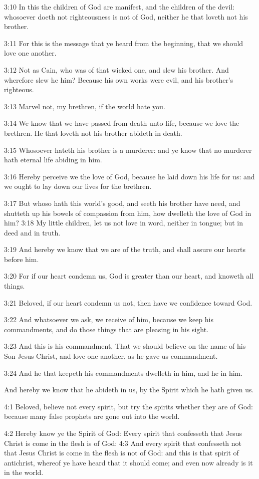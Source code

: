 3:10 In this the children of God are manifest, and the children of the devil: whosoever doeth not righteousness is not of God, neither he that loveth not his brother.

3:11 For this is the message that ye heard from the beginning, that we should love one another.

3:12 Not as Cain, who was of that wicked one, and slew his brother.  And wherefore slew he him? Because his own works were evil, and his brother's righteous.

3:13 Marvel not, my brethren, if the world hate you.

3:14 We know that we have passed from death unto life, because we love the brethren. He that loveth not his brother abideth in death.

3:15 Whosoever hateth his brother is a murderer: and ye know that no murderer hath eternal life abiding in him.

3:16 Hereby perceive we the love of God, because he laid down his life for us: and we ought to lay down our lives for the brethren.

3:17 But whoso hath this world's good, and seeth his brother have need, and shutteth up his bowels of compassion from him, how dwelleth the love of God in him?  3:18 My little children, let us not love in word, neither in tongue; but in deed and in truth.

3:19 And hereby we know that we are of the truth, and shall assure our hearts before him.

3:20 For if our heart condemn us, God is greater than our heart, and knoweth all things.

3:21 Beloved, if our heart condemn us not, then have we confidence toward God.

3:22 And whatsoever we ask, we receive of him, because we keep his commandments, and do those things that are pleasing in his sight.

3:23 And this is his commandment, That we should believe on the name of his Son Jesus Christ, and love one another, as he gave us commandment.

3:24 And he that keepeth his commandments dwelleth in him, and he in him.

And hereby we know that he abideth in us, by the Spirit which he hath given us.

4:1 Beloved, believe not every spirit, but try the spirits whether they are of God: because many false prophets are gone out into the world.

4:2 Hereby know ye the Spirit of God: Every spirit that confesseth that Jesus Christ is come in the flesh is of God: 4:3 And every spirit that confesseth not that Jesus Christ is come in the flesh is not of God: and this is that spirit of antichrist, whereof ye have heard that it should come; and even now already is it in the world.

